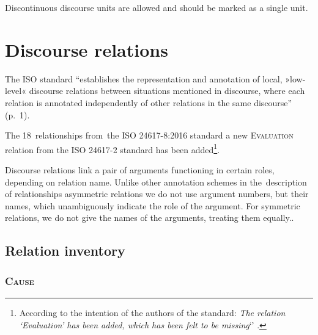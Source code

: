 \documentclass{udisc}
\begin{document}
Discontinuous discourse units are allowed and should be marked as a single unit.









\section{Discourse relations}
\label{discourse-relations}

The ISO standard “establishes the representation and annotation of local, »low-level« discourse relations between situations mentioned in discourse, where each relation is annotated independently of other relations in the same discourse” (p.~1). 

The 18~relationships from~the ISO 24617-8:2016 standard a new \textsc{Evaluation} relation from the ISO 24617-2 standard has been added\footnote{According to the intention of the authors of the standard: \textit{The relation ‘Evaluation’ has been added, which has been felt to be missing}‘’ \citep[p.~69]{iso-24617-2}.}.

Discourse relations link a pair of arguments functioning in certain roles, depending on relation name. Unlike other annotation schemes in the~description of relationships asymmetric relations we do not use argument numbers, but their names, which unambiguously indicate the role of the argument. For symmetric relations, we do not give the names of the arguments, treating them equally..




\subsection{Relation inventory}


\subsubsection{\textsc{Cause}}
\end{document}
